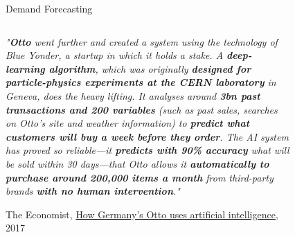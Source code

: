 \documentclass[main.tex]{subfiles}
\begin{document}
    \begin{frame}{Demand Forecasting}
        \begin{columns}
            \begin{column}{.6\textwidth}
                \begin{justify}
                    \textit{"\textbf{Otto} went further and created a system using the technology of Blue Yonder, a startup in which it holds a stake. A \textbf{deep-learning algorithm}, which was originally \textbf{designed for particle-physics experiments at the CERN laboratory} in Geneva, does the heavy lifting. It analyses around \textbf{3bn past transactions and 200 variables} (such as past sales, searches on Otto’s site and weather information) to \textbf{predict what customers will buy a week before they order}. The AI system has proved so reliable—it \textbf{predicts with 90\% accuracy} what will be sold within 30 days—that Otto allows it \textbf{automatically to purchase around 200,000 items a month} from third-party brands \textbf{with no human intervention}."}
                    \vspace*{1mm}
                    
                    The Economist, \href{https://www.economist.com/business/2017/04/12/how-germanys-otto-uses-artificial-intelligence}{How Germany’s Otto uses artificial intelligence}, 2017
                \end{justify}
            \end{column}
            \begin{column}{.4\textwidth}
                \begin{figure}
                    \label{fig:otto-blue-yonder}
                    \includegraphics[width=.8\textwidth]{figures/external/otto-blue-yonder.png}
                \end{figure}
            \end{column}
        \end{columns}
    \end{frame}
    
\end{document}
